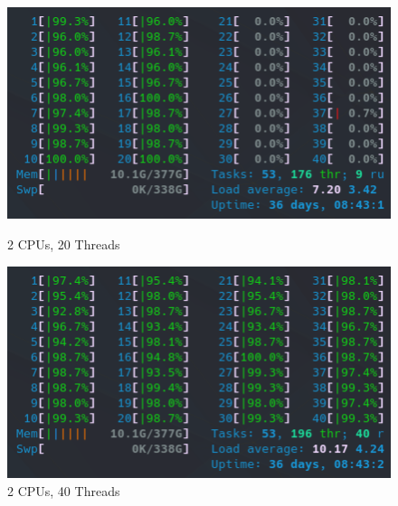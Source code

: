 \begin{figure}[!h]
    \centering
    \captionsetup{width=.48\linewidth}
    \begin{minipage}[t]{0.48\textwidth}
        \includegraphics[width=\textwidth]{figures/configurations/OMP/htop_cpus/2CPUs_20Threads.png}
        \caption{2 CPUs, 20 Threads}\label{fig:2CPUs_20Threads}
    \end{minipage}
    \hspace{0.4cm}
    \centering
    \captionsetup{width=.48\linewidth}
    \begin{minipage}[t]{0.48\textwidth}
        \includegraphics[width=\textwidth]{figures/configurations/OMP/htop_cpus/2CPUs_40Threads.png}
        \caption{2 CPUs, 40 Threads}\label{fig:2CPUs_40Threads}
    \end{minipage}
\end{figure}

